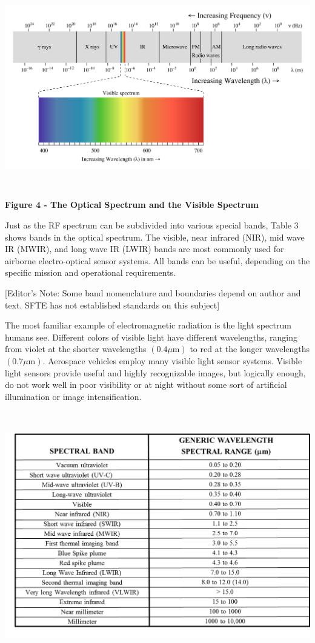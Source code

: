 \documentclass[
]{book}
\begin{document}
\includegraphics[width=6.5in,height=3.47778in]{media/19/image4.png}

\textbf{Figure 4 - The Optical Spectrum and the Visible Spectrum}

Just as the RF spectrum can be subdivided into various special bands, Table 3
shows bands in the optical spectrum. The visible, near infrared (NIR), mid wave
IR (MWIR), and long wave IR (LWIR) bands are most commonly used for airborne
electro-optical sensor systems. All bands can be useful, depending on the
specific mission and operational requirements.

{[}Editor's Note: Some band nomenclature and boundaries depend on author and text.
SFTE has not established standards on this subject{]}

The most familiar example of electromagnetic radiation is the light spectrum
humans see. Different colors of visible light have different wavelengths,
ranging from violet at the shorter wavelengths \(\left(0.4 \mu\text{m}\right)\)
to red at the longer wavelengths \(\left(0.7 \mu\text{m}\right)\). Aerospace
vehicles employ many visible light sensor systems. Visible light sensors provide
useful and highly recognizable images, but logically enough, do not work well in
poor visibility or at night without some sort of artificial illumination or
image intensification.

\includegraphics[width=6.33303in,height=4.26563in]{media/19/image5.png}
\end{document}
